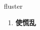 
\begin{frame}
{\huge fluster}
\begin{center}
\begin{enumerate}\Large
  \item \textbf{使慌乱}
\end{enumerate}
\end{center}
\end{frame}
